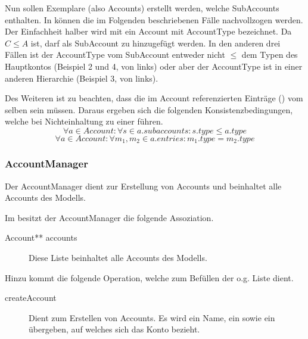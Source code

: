 
Nun sollen Exemplare (also Accounts) erstellt werden, welche SubAccounts enthalten. In  können die im Folgenden beschriebenen Fälle nachvollzogen werden.
Der Einfachheit halber wird mit  ein Account  mit AccountType  bezeichnet. Da $C \leq A$ ist, darf  als SubAccount zu  hinzugefügt werden.
In den anderen drei Fällen ist der AccountType vom SubAccount entweder nicht $\leq$ dem Typen des Hauptkontos (Beispiel 2 und 4, von links) oder aber der AccountType ist in einer anderen Hierarchie (Beispiel 3, von links).


Des Weiteren ist zu beachten, dass die im Account referenzierten Einträge () vom selben 
 sein müssen. Daraus ergeben sich die folgenden Konsistenzbedingungen, 
welche bei Nichteinhaltung zu einer  führen.
\begin{equation}
	\forall a \in Account: \forall s \in a.subaccounts: s.type \leq a.type
\end{equation}
\begin{equation}
	\forall a \in Account: \forall m_1, m_2 \in a.entries: m_1.type = m_2.type
\end{equation}


\subsubsection{AccountManager}
Der AccountManager dient zur Erstellung von Accounts und beinhaltet alle Accounts des Modells.

Im \MM besitzt der AccountManager die folgende Assoziation.
\begin{description}
	\item[Account** accounts] Diese Liste beinhaltet alle Accounts des Modells.
\end{description}

Hinzu kommt die folgende Operation, welche zum Befüllen der o.g. Liste dient.
\begin{description}
	\item[createAccount] Dient zum Erstellen von Accounts. Es wird ein Name, ein  sowie ein  übergeben, auf welches sich das Konto bezieht.
\end{description}

